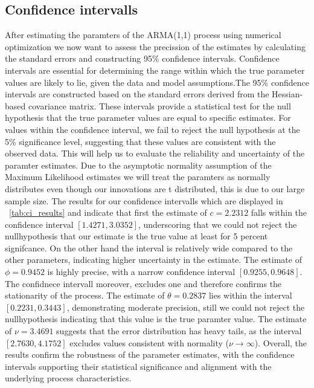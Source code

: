 \documentclass[a4paper,12pt]{article}
\begin{document}
\subsection{Confidence intervalls}
After estimating the paramters of the ARMA(1,1) process using numerical optimization we now want to assess the precission of the estimates by calculating the standard errors and constructing 95\% confidence intervals.
Confidence intervals are essential for determining the range within which the true parameter values are likely to lie, given the data and model assumptions.The 95\% confidence intervals are constructed based on the standard errors derived from the Hessian-based covariance matrix. These intervals provide a statistical test for the null hypothesis that the true parameter values are equal to specific estimates. 
For values within the confidence interval, we fail to reject the null hypothesis at the 5\% significance level, suggesting that these values are consistent with the observed data. This will help us to evaluate the reliability and uncertainty of the paramter estimates.
Due to the asymptotic normality assumption of the Maximum Likelihood estimates we will treat the paramters as normally distributes even though our innovations are t distributed, this is due to our large sample size. 
The results for our confidence intervalls which are displayed in ~\ref{tab:ci_results} and indicate that first the estimate of \(c = 2.2312\) falls within the confidence interval \([1.4271, 3.0352]\), underscoring that we could not reject the nullhypothesis that our estimate is the true value at least for 5 percent signifcance. On the other hand the interval is relatively wide compared to the other parameters, indicating higher uncertainty in the estimate. The estimate of \(\phi = 0.9452\) is highly precise, with a narrow confidence interval \([0.9255, 0.9648]\). The confidnece intervall moreover, excludes one and therefore confirms the stationarity of the process. The estimate of \(\theta = 0.2837\) lies within the interval \([0.2231, 0.3443]\), demonstrating moderate precision, still we could not reject the nullhypothesis indicating that this value is the true paramter value.  The estimate of \(\nu = 3.4691\) suggests that the error distribution has heavy tails, as the interval \([2.7630, 4.1752]\) excludes values consistent with normality (\(\nu \to \infty\)).
Overall, the results confirm the robustness of the parameter estimates, with the confidence intervals supporting their statistical significance and alignment with the underlying process characteristics. 
\end{document}
